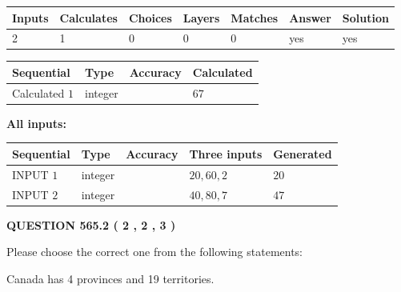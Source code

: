 \documentclass[12pt]{article}
\begin{document}
 

 
   
   
   
   
\noindent\begin{tabular}{|l|l|l|l|l|l|l|}
 \hline
Inputs & Calculates & Choices & Layers & Matches & Answer & Solution \\ \hline
 2  & 
 1  & 
 0
  & 
 0  & 
 0  & 
  yes & 
  yes 
  \\ \hline
 \end{tabular}
   
   
   
   
\noindent{}
   
   
  
  
\noindent\begin{tabular}{|l|l|l|l|}
\hline
 Sequential & Type & Accuracy & Calculated \\ 
\hline
 
 
  Calculated $  1 $ & integer &  & 
  $ 67 $ 
 \\  \hline  
 \end{tabular}
   
   
   
   
\noindent\vspace{0.1in}\hspace{-0.08in} {\textbf{\Large{All inputs: }}}
   
   
  
  
\noindent\begin{tabular}{|l|l|l|l|l|}
\hline
 Sequential & Type & Accuracy & Three inputs & Generated \\ 
\hline
 
 
  INPUT $  1 $ & integer &  & $
 20
 , 
 60
 , 
 2
 $ & $ 20 $ 
 \\  \hline  
 
 
  INPUT $  2 $ & integer &  & $
 40
 , 
 80
 , 
 7
 $ & $ 47 $ 
 \\  \hline  
 \end{tabular}
   
   
  
\vspace{0.2in}
  
{\textbf{\Large{QUESTION
565.2 
 ( 2 , 2 , 3 )
}}}
  
  
Please choose the correct one from the following statements:
 
 
Canada has   4 provinces and  19 territories.
 
\end{document}
